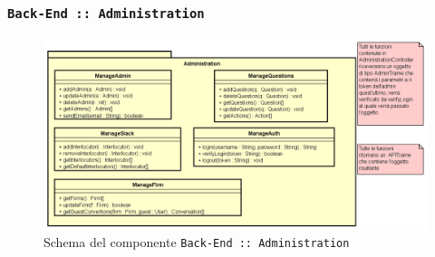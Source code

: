 \documentclass[../DefinizioneDiProdotto.tex]{subfiles}
\begin{document}
	\subsubsection{ \texttt{Back-End :: Administration}}
	\begin{figure}[!h]
		\centering
		\includegraphics[width=\textwidth]{Architettura/Back-End/Administration.png}
		\caption{Schema del componente \texttt{Back-End :: Administration}}
	\end{figure}
\end{document}
